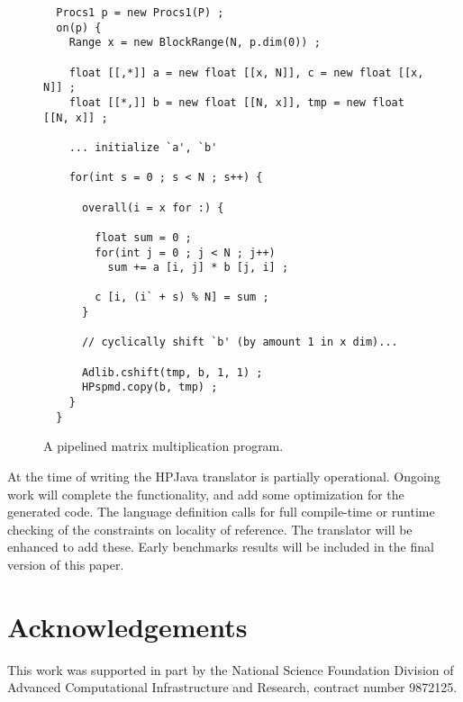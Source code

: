 
\begin{figure}[tbp]
\small
\begin{verbatim}
  Procs1 p = new Procs1(P) ;
  on(p) {
    Range x = new BlockRange(N, p.dim(0)) ;

    float [[,*]] a = new float [[x, N]], c = new float [[x, N]] ;
    float [[*,]] b = new float [[N, x]], tmp = new float [[N, x]] ;

    ... initialize `a', `b'

    for(int s = 0 ; s < N ; s++) {

      overall(i = x for :) {

        float sum = 0 ;
        for(int j = 0 ; j < N ; j++)
          sum += a [i, j] * b [j, i] ;

        c [i, (i` + s) % N] = sum ;
      }

      // cyclically shift `b' (by amount 1 in x dim)...

      Adlib.cshift(tmp, b, 1, 1) ;
      HPspmd.copy(b, tmp) ;
    }
  }
\end{verbatim}
\normalsize
\caption{A pipelined matrix multiplication program.\label{fig:pipedMatmul}}
\end{figure}

At the time of writing the HPJava translator is partially operational.
Ongoing work will complete the functionality, and add some optimization
for the generated code.  The language definition calls for full
compile-time or runtime checking of the constraints on locality of
reference.  The translator will be enhanced to add these.  Early
benchmarks results will be included in the final version of this paper.

\section{Acknowledgements}

This work was supported in part by the National Science Foundation
Division of Advanced Computational Infrastructure and Research,
contract number 9872125.






